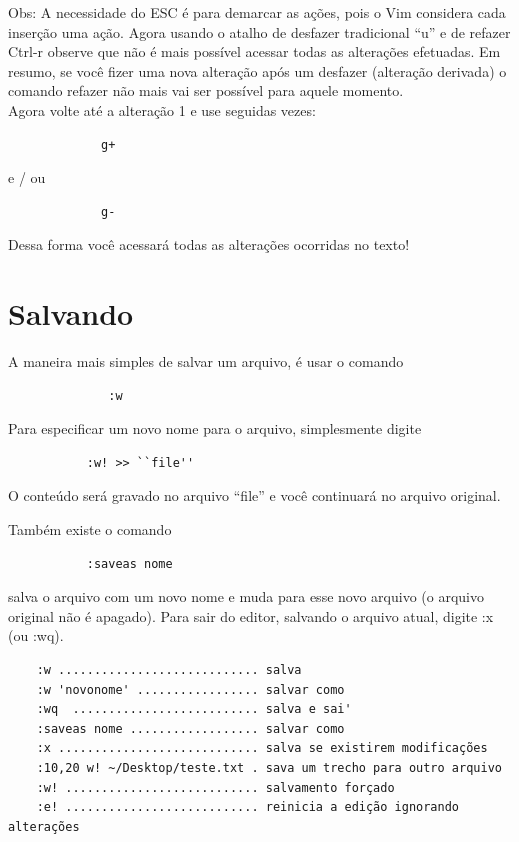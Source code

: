 \documentclass[10pt,a4paper,openany]{book}
\begin{document}
Obs: A necessidade do ESC é para demarcar as ações, pois o Vim
considera cada inserção uma ação.  Agora usando o atalho de desfazer
tradicional ``u'' e de refazer Ctrl-r observe que não é mais possível
acessar todas as alterações efetuadas. Em resumo, se você fizer uma
nova alteração após um desfazer (alteração derivada) o comando refazer
não mais vai ser possível para aquele momento. \\

Agora volte até a alteração 1 e use seguidas vezes:

\begin{verbatim}
			 g+
\end{verbatim}

e / ou

\begin{verbatim}
			 g-
\end{verbatim}

Dessa forma você acessará todas as alterações ocorridas no texto!

\section{Salvando}

A maneira mais simples de salvar um arquivo, é usar o comando

\begin{verbatim}
			  :w
\end{verbatim}


Para especificar um novo nome para o arquivo, simplesmente digite

\begin{verbatim}
		   :w! >> ``file''
\end{verbatim}

O conteúdo será gravado no arquivo ``file'' e você continuará no arquivo original.

Também existe o comando

\begin{verbatim}
		   :saveas nome
\end{verbatim}

salva o arquivo com um novo nome e muda para esse novo arquivo (o arquivo original não é apagado).
Para sair do editor, salvando o arquivo atual, digite :x (ou :wq).

\begin{verbatim}
	:w ............................ salva
	:w 'novonome' ................. salvar como
	:wq  .......................... salva e sai'
	:saveas nome .................. salvar como
	:x ............................ salva se existirem modificações
	:10,20 w! ~/Desktop/teste.txt . sava um trecho para outro arquivo
	:w! ........................... salvamento forçado
	:e! ........................... reinicia a edição ignorando alterações
\end{verbatim}
\end{document}
